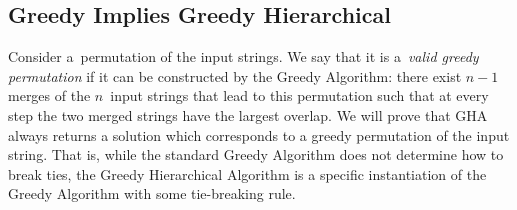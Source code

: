 \subsection{Greedy Implies Greedy Hierarchical}
\label{sec:gr_im_wghc}
Consider a~permutation of the input strings. We say that it is a~{\em valid greedy permutation} if it can be constructed by the Greedy Algorithm: there exist $n-1$ merges of the $n$~input strings that lead to this permutation such that at every step the two merged strings have the largest overlap. We will prove that GHA always returns a solution which corresponds to a greedy permutation of the input string. That is, while the standard Greedy Algorithm does not determine how to break ties, the Greedy Hierarchical Algorithm is a specific instantiation of the Greedy Algorithm with some tie-breaking rule.

